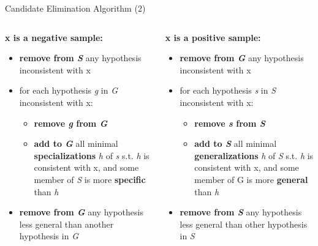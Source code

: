 \documentclass{beamer}
\begin{document}
\begin{frame}{Candidate Elimination Algorithm (2)}

\begin{columns}
\begin{column}{0.55\textwidth}
\textbf{\color{brown}x is a negative sample:}
\begin{itemize}
\item \textbf{remove from \emph{S}} any hypothesis inconsistent with x
\item for each hypothesis \emph{g} in \emph{G} inconsistent with x: 
  \begin{itemize}
  \item \textbf{remove \emph{g} from \emph{G}}
  \item \textbf{add to \emph{G}} all minimal \textbf{specializations} \emph{h} of \emph{s} s.t. \emph{h} is consistent with x, and some member of \emph{S} is more \textbf{specific} than \emph{h}
  \end{itemize}
\item \textbf{remove from \emph{G}} any hypothesis less general than another hypothesis in \emph{G}
\end{itemize}	
\end{column}
\begin{column}{0.55\textwidth}
\textbf{\color{blue}x is a positive sample:}
\begin{itemize}
\item \textbf{remove from \emph{G}} any hypothesis inconsistent with x
\item for each hypothesis \emph{s} in \emph{S} inconsistent with x:
	\begin{itemize}
	\item \textbf{remove \emph{s} from \emph{S}}
    \item \textbf{add to \emph{S}} all minimal \textbf{generalizations} \emph{h} of \emph{S} s.t. \emph{h} is consistent with x, and some member of G is more \textbf{general} than \emph{h}
	\end{itemize}
\item \textbf{remove from \emph{S}} any hypothesis less general than other hypothesis in \emph{S}
\end{itemize}
\end{column}
\end{columns}
\end{frame}
\end{document}
